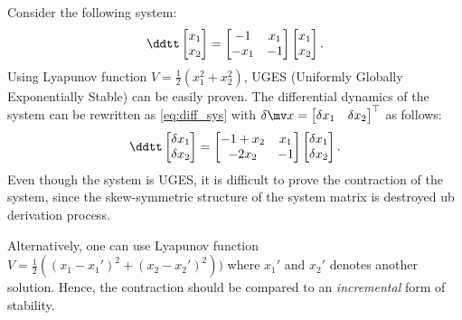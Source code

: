 \begin{example}
    Consider the following system:
    \begin{equation}
        \ddtt
        \begin{bmatrix}
            x_1\\
            x_2
        \end{bmatrix}
        =
        \begin{bmatrix}
            -1 & x_1\\
            -x_1 & -1
        \end{bmatrix}
        \begin{bmatrix}
            x_1\\
            x_2
        \end{bmatrix}
        .
    \end{equation}
    Using Lyapunov function $V=\tfrac{1}{2}(x_1^2+x_2^2)$, UGES (Uniformly Globally Exponentially Stable) can be easily proven.
    The differential dynamics of the system can be rewritten as \eqref{eq:diff_sys} with $\delta\bdx=\begin{bmatrix}\delta x_1 & \delta x_2\end{bmatrix}^\top$ as follows:
    \begin{equation}
        \ddtt
        \begin{bmatrix}
            \delta x_1\\
            \delta x_2
        \end{bmatrix}
        =
        \begin{bmatrix}
            -1+x_2 & x_1\\
            -2x_2 & -1
        \end{bmatrix}
        \begin{bmatrix}
            \delta x_1\\
            \delta x_2
        \end{bmatrix}
        .
    \end{equation}
    Even though the system is UGES, it is difficult to prove the contraction of the system, since the skew-symmetric structure of the system matrix is destroyed ub derivation process.

    Alternatively, one can use Lyapunov function $V=\tfrac{1}{2}((x_1-x_1')^2+(x_2-x_2')^2))$ where $x_1'$ and $x_2'$ denotes another solution.
    Hence, the contraction should be compared to an \textit{incremental} form of stability.
\end{example}

